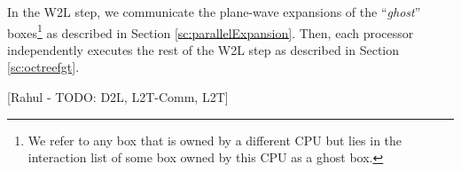 
 In the W2L step, we communicate the plane-wave expansions of the ``{\em ghost}'' boxes\footnote{We refer to any box that
 is owned by a different CPU but lies in the interaction list of some box owned by this CPU as a ghost box.} 
 as described in Section \ref{sc:parallelExpansion}. Then, each processor independently executes the rest of the W2L step as
 described in Section \ref{sc:octreefgt}.

[Rahul - TODO: D2L, L2T-Comm, L2T]

%
%


